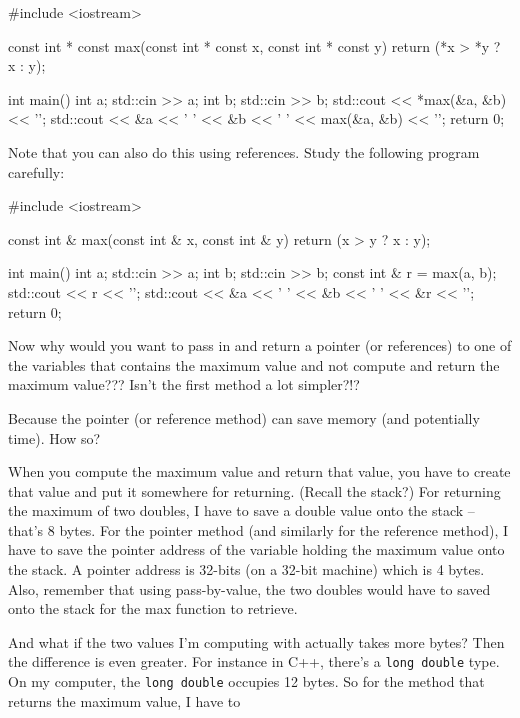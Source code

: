 \begin{consolethree}[escapeinside=||]
#include <iostream>

const int * const max(const int * const x,
                      const int * const y)
{
    return (*x > *y ? x : y);
}

int main()
{
    int a;
    std::cin >> a;
    int b;
    std::cin >> b;
    std::cout << *max(&a, &b) << '\n';
    std::cout << &a << ' ' << &b << ' '
                    << max(&a, &b) << '\n';
    return 0;
}
\end{consolethree}
Note that you can also do this using references. Study the following program carefully:

\begin{consolethree}[escapeinside=||]
#include <iostream>

const int & max(const int & x, const int & y)
{
    return (x > y ? x : y);
}

int main()
{
    int a;
    std::cin >> a;
    int b;
    std::cin >> b;
    const int & r = max(a, b);
    std::cout << r << '\n';
    std::cout << &a << ' ' << &b
                    << ' ' << &r << '\n';
    return 0;
}
\end{consolethree}
Now why would you want to pass in and return a pointer (or references) to one of the variables that contains the maximum value and not compute and return the maximum value??? Isn't the first method a lot simpler?!?

Because the pointer (or reference method) can save memory (and potentially time). How so?

When you compute the maximum value and return that value, you have to create that value and put it somewhere for returning. (Recall the stack?) For returning the maximum of two doubles, I have to save a double value onto the stack -- that's 8 bytes. For the pointer method (and similarly for the reference method), I have to save the pointer address of the variable holding the maximum value onto the stack. A pointer address is 32-bits (on a 32-bit machine) which is 4 bytes. Also, remember that using pass-by-value, the two doubles would have to saved onto the stack for the max function to retrieve.

And what if the two values I'm computing with actually takes more bytes?
Then the difference is even greater. For instance in C++, there's a \texttt{long double} type. On my computer, the \texttt{long double} occupies 12 bytes. So for the method that returns the maximum value, I have to

